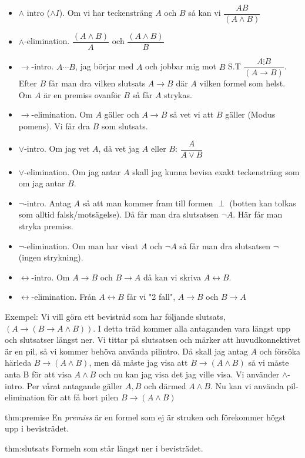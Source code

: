 \begin{itemize}
  \item $\wedge$ intro ($\wedge I$). Om vi har teckensträng $A$ och $B$  så kan vi $\dfrac{AB}{(A\wedge B)}$
  \item $\wedge$-elimination. $\dfrac{(A\wedge B)}{A}$ och $\dfrac{(A\wedge B)}{B}$
  \item $\rightarrow$-intro. $A\cdots B$, jag börjar med $A$ och jobbar mig mot $B$ S.T $\dfrac{A\vdots B}{(A\rightarrow B)}$. Efter $B$ får man dra vilken slutsats $A\rightarrow B$ där $A$ vilken formel som helst. Om $A$ är en premiss ovanför $B$ så får $A$ strykas.
    \par\bigskip
  \item $\rightarrow$-elimination. Om $A$ gäller och $A\rightarrow B$ så vet vi att $B$ gäller (Modus pomens). Vi får dra $B$ som slutsats.
    \par\bigskip
  \item $\vee$-intro. Om jag vet $A$, då vet jag $A$ eller $B$: $\dfrac{A}{A\vee B}$
    \par\bigskip
  \item $\vee$-elimination. Om jag antar $A$ skall jag kunna bevisa exakt teckensträng som om jag antar $B$.
    \par\bigskip
  \item $\neg$-intro. Antag $A$ så att man kommer fram till formen $\perp$ (botten kan tolkas som alltid falsk/motsägelse). Då får man dra slutsatsen $\neg A$. Här får man stryka premiss.
    \par\bigskip
  \item $\neg$-elimination. Om man har visat $A$ och $\neg A$ så får man dra slutsatsen $\neg$ (ingen strykning).
    \par\bigskip
  \item $\leftrightarrow$-intro. Om $A\rightarrow B$ och $B\rightarrow A$ då kan vi skriva $A\leftrightarrow B$.
    \par\bigskip
\item $\leftrightarrow$-elimination. Från $A\leftrightarrow B$ får vi "2 fall", $A\rightarrow B$ och $B\rightarrow A$
\end{itemize}
\par\bigskip
\noindent Exempel: Vi vill göra ett bevisträd som har följande slutsats, $(A\rightarrow (B\rightarrow A\wedge B))$. I detta träd kommer alla antaganden vara längst upp och slutsatser längst ner. Vi tittar på slutsatsen och märker att huvudkonnektivet är en pil, så vi kommer behöva använda pilintro. Då skall jag antag $A$ och försöka härleda $B\rightarrow(A\wedge B)$, men då måste jag visa att $B\rightarrow(A\wedge B)$ så vi måste anta B för att visa $A\wedge B$ och nu kan jag visa det jag ville visa. Vi använder $\wedge$-intro. Per vårat antagande gäller $A, B$ och därmed $A\wedge B$. Nu kan vi använda pil-elimination för att få bort pilen $B\rightarrow(A\wedge B)$
\par\bigskip


\begin{theo}[Premiss]{thm:premise}
  En \textit{premiss} är en formel som ej är struken och förekommer högst upp i bevisträdet.
\end{theo}
\par\bigskip

\begin{theo}[Slutsats]{thm:slutsats}
  Formeln som står längst ner i bevisträdet.
\end{theo}
